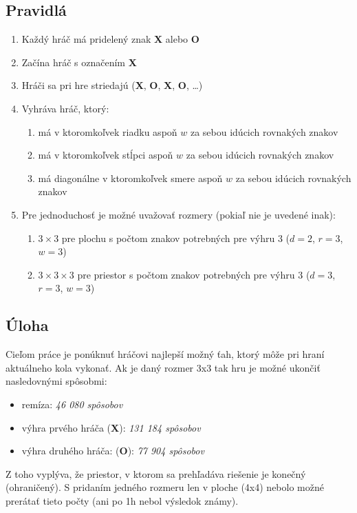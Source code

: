 \subsection{Pravidlá}\label{subsec:rules}

\begin{enumerate}
    \item Každý hráč má pridelený znak \textbf{X} alebo \textbf{O}
    \item Začína hráč s označením \textbf{X}
    \item Hráči sa pri hre striedajú (\textbf{X}, \textbf{O}, \textbf{X}, \textbf{O}, \ldots)
    \item Vyhráva hráč, ktorý:
    \begin{enumerate}
        \item má v ktoromkoľvek riadku aspoň $w$ za sebou idúcich rovnakých znakov
        \item má v ktoromkoľvek stĺpci aspoň $w$ za sebou idúcich rovnakých znakov
        \item má diagonálne v ktoromkoľvek smere aspoň $w$ za sebou idúcich rovnakých znakov
    \end{enumerate}
    \item Pre jednoduchosť je možné uvažovať rozmery (pokiaľ nie je uvedené inak):
    \begin{enumerate}
        \item $3 \times 3$ pre plochu s počtom znakov potrebných pre výhru 3 ($d = 2$, $r = 3$, $w = 3$)
        \item $3 \times 3 \times 3$ pre priestor s počtom znakov potrebných pre výhru 3 ($d = 3$, $r = 3$, $w = 3$)
    \end{enumerate}
\end{enumerate}

\subsection{Úloha}\label{subsec:task}

Cieľom práce je ponúknuť hráčovi najlepší možný ťah, ktorý môže pri hraní aktuálneho kola vykonať.
Ak je daný rozmer 3x3 tak hru je možné ukončiť nasledovnými spôsobmi:\cite{number_of_wins}
\begin{itemize}
    \item remíza: \emph{46 080 spôsobov}
    \item výhra prvého hráča (\textbf{X}): \emph{131 184 spôsobov}
    \item výhra druhého hráča: (\textbf{O}): \emph{77 904 spôsobov}
\end{itemize}
Z toho vyplýva, že priestor, v ktorom sa prehľadáva riešenie je konečný (ohraničený).
S pridaním jedného rozmeru len v ploche (4x4) nebolo možné prerátať tieto počty (ani po 1h nebol výsledok známy).